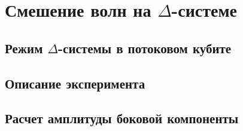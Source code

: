 \chapter{Смешение волн на $\Delta$-системе}

\section{Режим $\Delta$-системы в потоковом кубите}
\section{Описание эксперимента}
\section{Расчет амплитуды боковой компоненты}
